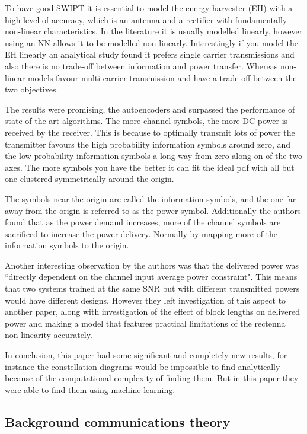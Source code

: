 \documentclass[12pt,onecolumn,letterpaper]{article}
\begin{document}
To have good SWIPT it is essential to model the energy harvester (EH) with a high level of accuracy, which is an antenna and a rectifier with fundamentally non-linear characteristics. In the literature it is usually modelled linearly, however using an NN allows it to be modelled non-linearly. Interestingly if you model the EH  linearly an analytical study found it prefers single carrier transmissions and also there is no trade-off between information and power transfer.  Whereas non-linear models favour multi-carrier transmission and have a trade-off between the two objectives.

The results were promising, the autoencoders and surpassed the performance of state-of-the-art algorithms. The more channel symbols, the more DC power is received by the receiver. This is because to optimally transmit lots of power the transmitter favours the high probability information symbols around zero, and the low probability information symbols a long way from zero along on of the two axes. The more symbols you have the better it can fit the ideal pdf with all but one clustered symmetrically around the origin.

The symbols near the origin are called the information symbols, and the one far away from the origin is referred to as the power symbol. Additionally the authors found that as the power demand increases, more of the channel symbols are sacrificed to increase the power delivery. Normally by mapping more of the information symbols to the origin. 

Another interesting observation by the authors was that the delivered power was ``directly dependent on the channel input average power constraint". This means that two systems trained at the same SNR but with different transmitted powers would have different designs. However they left investigation of this aspect to another paper, along with investigation of the effect of block lengths on delivered power and making a model that features practical limitations of the rectenna non-linearity accurately.

In conclusion, this paper had some significant and completely new results, for instance the constellation diagrams would be impossible to find analytically because of the computational complexity of finding them. But in this paper they were able to find them using machine learning.

\subsection{Background communications theory}
\end{document}
